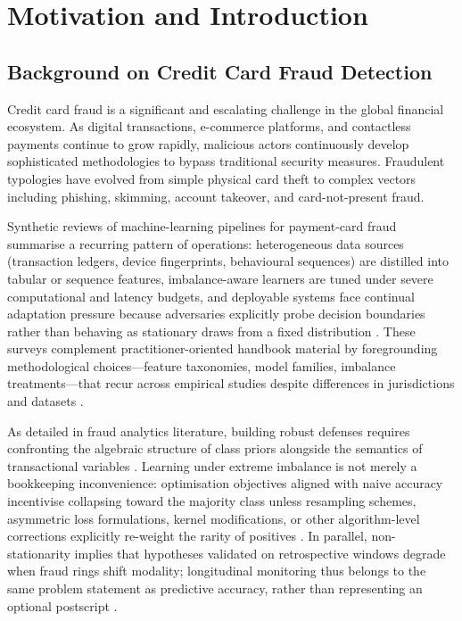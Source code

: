 \chapter{Motivation and Introduction}

\section{Background on Credit Card Fraud Detection}
Credit card fraud is a significant and escalating challenge in the global financial ecosystem. As digital transactions, e-commerce platforms, and contactless payments continue to grow rapidly, malicious actors continuously develop sophisticated methodologies to bypass traditional security measures. Fraudulent typologies have evolved from simple physical card theft to complex vectors including phishing, skimming, account takeover, and card-not-present fraud. 

Synthetic reviews of machine-learning pipelines for payment-card fraud summarise a recurring pattern of operations: heterogeneous data sources (transaction ledgers, device fingerprints, behavioural sequences) are distilled into tabular or sequence features, imbalance-aware learners are tuned under severe computational and latency budgets, and deployable systems face continual adaptation pressure because adversaries explicitly probe decision boundaries rather than behaving as stationary draws from a fixed distribution \cite{lucas_jurgovsky_ccfraud_survey2020,yousefi_fraud_survey2019}. These surveys complement practitioner-oriented handbook material by foregrounding methodological choices—feature taxonomies, model families, imbalance treatments—that recur across empirical studies despite differences in jurisdictions and datasets \cite{fraud_handbook}.

As detailed in fraud analytics literature, building robust defenses requires confronting the algebraic structure of class priors alongside the semantics of transactional variables \cite{fraud_handbook}. Learning under extreme imbalance is not merely a bookkeeping inconvenience: optimisation objectives aligned with naive accuracy incentivise collapsing toward the majority class unless resampling schemes, asymmetric loss formulations, kernel modifications, or other algorithm-level corrections explicitly re-weight the rarity of positives \cite{he_garcia_imbalanced2009}. In parallel, non-stationarity implies that hypotheses validated on retrospective windows degrade when fraud rings shift modality; longitudinal monitoring thus belongs to the same problem statement as predictive accuracy, rather than representing an optional postscript \cite{lucas_jurgovsky_ccfraud_survey2020}.

